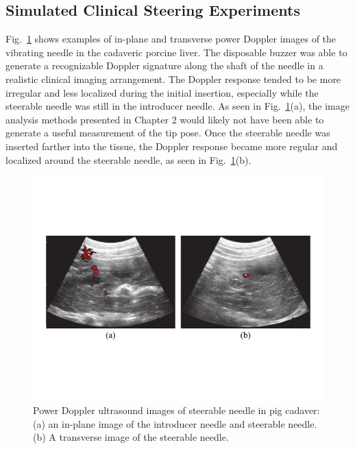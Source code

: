 \subsection{Simulated Clinical Steering Experiments}
Fig.~\ref{fig:CadaverDoppler} shows examples of in-plane and transverse power Doppler images of the vibrating needle in the cadaveric porcine liver. The disposable buzzer was able to generate a recognizable Doppler signature along the shaft of the needle in a realistic clinical imaging arrangement. The Doppler response tended to be more irregular and less localized during the initial insertion, especially while the steerable needle was still in the introducer needle. As seen in Fig.~\ref{fig:CadaverDoppler}(a), the image analysis methods presented in Chapter 2 would likely not have been able to generate a useful measurement of the tip pose. Once the steerable needle was inserted farther into the tissue, the Doppler response became more regular and localized around the steerable needle, as seen in Fig.~\ref{fig:CadaverDoppler}(b). 

\begin{figure}[!t]
\centering
\includegraphics[width = \columnwidth]{./Images/Chapter5/CadaverDoppler/CadaverDoppler.pdf}%
\caption[Power Doppler ultrasound images of steerable needle in pig cadaver]{Power Doppler ultrasound images of steerable needle in pig cadaver: (a) an in-plane image of the introducer needle and steerable needle. (b) A transverse image of the steerable needle.  }
\label{fig:CadaverDoppler}
\end{figure}  

